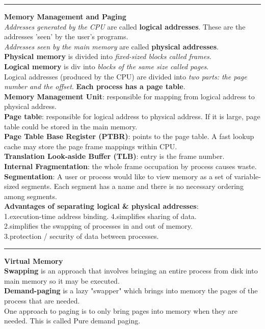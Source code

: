 \documentclass[8pt,a4paper,landscape]{article}
\newcommand{\topic}[1]{\textbf{\large #1}}
\begin{document}
\begin{spacing}{-1}
\begin{multicols*}{3}
\hrule \noindent
\topic{Memory Management and Paging} \\
\textit{Addresses generated by the CPU} are called \textbf{logical addresses}. 
These are the addresses 'seen' by the user's programs.\\
\textit{Addresses seen by the main memory} are called \textbf{physical addresses}. \\
\textbf{Physical memory} is divided into \textit{fixed-sized blocks called frames}. \\
\textbf{Logical memory} is div into \textit{blocks of the same size called pages}. \\
Logical addresses (produced by the CPU) are divided into \textit{two parts: the page number and the offset}. 
\textbf{Each process has a page table}. \\
\textbf{Memory Management Unit}: responsible for mapping from logical address to physical address. \\
\textbf{Page table}: responsible for logical address to physical address. If it is large, page table could be
stored in the main memory. \\
\textbf{Page Table Base Register (PTBR)}: points to the page table. A fast lookup cache may store the page frame mappings within CPU. \\
\textbf{Translation Look-aside Buffer (TLB)}: entry is the frame number. \\
\textbf{Internal Fragmentation}: the whole frame occupation by process causes waste. \\
\textbf{Segmentation}: A user or process would like to view memory as a set of variable-sized segments. Each segment has a name and there is no necessary ordering among segments. \\
\textbf{Advantages of separating logical \& physical addresses}: \\
1.execution-time address binding.  4.simplifies sharing of data. \\
2.simplifies the swapping of processes in and out of memory. \\
3.protection / security of data between processes.
\hrule \noindent
\topic{Virtual Memory} \\
\textbf{Swapping} is an approach that involves bringing an entire process from disk into main memory so it may be executed. \\
\textbf{Demand-paging} is a lazy "swapper" which brings into memory the pages of the process that are needed. \\
One approach to paging is to only bring pages into memory when they are needed. This is called Pure demand paging. \\

\end{multicols*}
\end{spacing}
\end{document}
